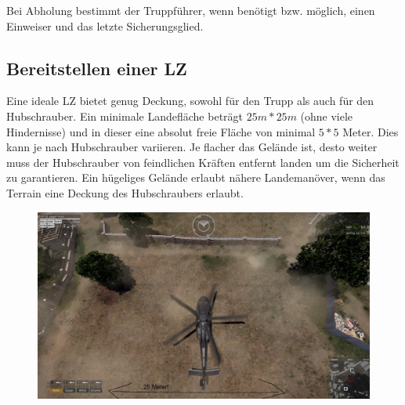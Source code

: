 	Bei Abholung bestimmt der Truppführer, wenn benötigt bzw. möglich, einen Einweiser und das letzte Sicherungsglied.

\subsection{Bereitstellen einer \acf{LZ}}
	Eine ideale \ac{LZ} bietet genug Deckung, sowohl für den Trupp als auch für den Hubschrauber. Ein minimale Landefläche beträgt $25m * 25m$ (ohne viele Hindernisse) und in dieser eine absolut freie Fläche von minimal $5 * 5$ Meter. Dies kann je nach Hubschrauber variieren. Je flacher das Gelände ist, desto weiter muss der Hubschrauber von feindlichen Kräften entfernt landen um die Sicherheit zu garantieren. Ein hügeliges Gelände erlaubt nähere Landemanöver, wenn das Terrain eine Deckung des Hubschraubers erlaubt.
	\begin{figure}[htbp]
		\centering
		\includegraphics[width=0.95\linewidth]{./img/fortgeschrittenes/hubschrauberUndInfanterie/landezone}
	\end{figure}	

